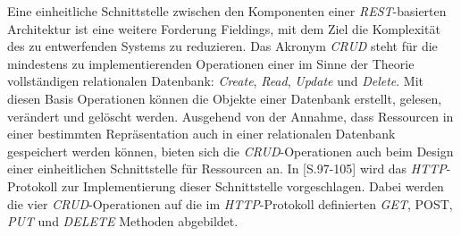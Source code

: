 Eine einheitliche Schnittstelle zwischen den Komponenten einer
\textit{REST}-basierten Architektur ist eine weitere Forderung
Fieldings, mit dem Ziel die Komplexität des zu entwerfenden Systems zu
reduzieren. Das Akronym \textit{CRUD}  steht für die mindestens zu implementierenden
Operationen einer im Sinne der Theorie vollständigen relationalen
Datenbank: \textit{Create}, \textit{Read}, \textit{Update} und
\textit{Delete}. Mit diesen Basis Operationen können die Objekte einer
Datenbank erstellt, gelesen, verändert und gelöscht werden. Ausgehend
von der Annahme, dass Ressourcen in einer bestimmten Repräsentation
auch in einer relationalen Datenbank gespeichert werden können, bieten
sich die \textit{CRUD}-Operationen auch beim Design einer
einheitlichen Schnittstelle für Ressourcen an. In
\cite{Richardson07}[S.97-105] wird das \textit{HTTP}-Protokoll zur
Implementierung dieser Schnittstelle vorgeschlagen. Dabei werden die
vier \textit{CRUD}-Operationen auf die im \textit{HTTP}-Protokoll
definierten \textit{GET}, \textup{POST}, \textit{PUT} und
\textit{DELETE} Methoden abgebildet.

